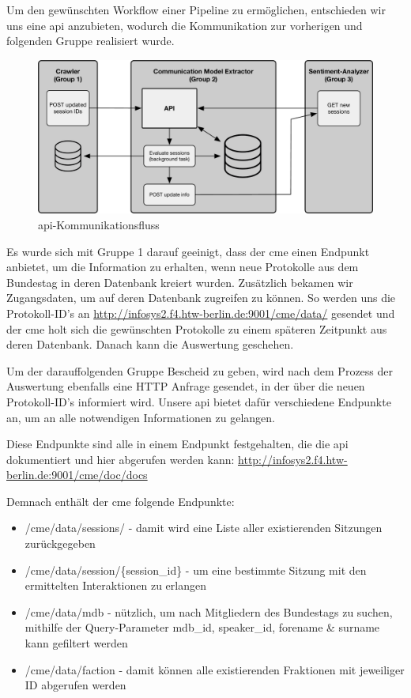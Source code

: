 Um den gewünschten Workflow einer Pipeline zu ermöglichen, entschieden wir
uns eine \gls{api} anzubieten, wodurch die Kommunikation zur vorherigen und
folgenden Gruppe realisiert wurde.

\begin{figure}[ht]
    \begin{center}
        \includegraphics[width=\textwidth]{images/03-cme/Communications.pdf}
    \end{center}
    \caption{\gls{api}-Kommunikationsfluss}
    \label{fig:03_api_call_flow}
\end{figure}

Es wurde sich mit Gruppe 1 darauf geeinigt, dass der \gls{cme} einen Endpunkt
anbietet, um die Information zu erhalten, wenn neue Protokolle aus dem
Bundestag in deren Datenbank kreiert wurden. Zusätzlich bekamen wir
Zugangsdaten, um auf deren Datenbank zugreifen zu können. So werden uns die
Protokoll-ID's an \url{http://infosys2.f4.htw-berlin.de:9001/cme/data/} gesendet
und der \gls{cme} holt sich die gewünschten Protokolle zu einem späteren Zeitpunkt
aus deren Datenbank. Danach kann die Auswertung geschehen.

Um der darauffolgenden Gruppe Bescheid zu geben, wird nach dem Prozess der
Auswertung ebenfalls eine HTTP Anfrage gesendet, in der über die neuen
Protokoll-ID's informiert wird. Unsere \gls{api} bietet dafür verschiedene Endpunkte
an, um an alle notwendigen Informationen zu gelangen.

Diese Endpunkte sind alle in einem Endpunkt festgehalten, die die \gls{api}
dokumentiert und hier abgerufen werden kann:
\url{http://infosys2.f4.htw-berlin.de:9001/cme/doc/docs}

Demnach enthält der \gls{cme} folgende Endpunkte:
\begin{itemize}
    \item /cme/data/sessions/ - damit wird eine Liste aller existierenden
        Sitzungen zurückgegeben
    \item /cme/data/session/\{session\_id\} - um eine bestimmte Sitzung mit den
        ermittelten Interaktionen zu erlangen
    \item /cme/data/mdb - nützlich, um nach Mitgliedern des Bundestags zu
        suchen, mithilfe der Query-Parameter mdb\_id, speaker\_id, forename
        \& surname kann gefiltert werden
    \item /cme/data/faction - damit können alle existierenden Fraktionen mit
        jeweiliger ID abgerufen werden
\end{itemize}

